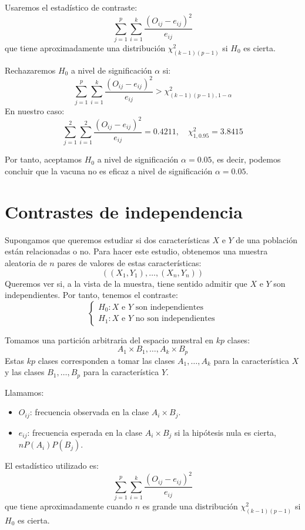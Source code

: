 \begin{exercise}
    Usaremos el estadístico de contraste:
    $$\sum_{j=1}^p \sum_{i=1}^k \frac{(O_{ij}-e_{ij})^2}{e_{ij}}$$
    que tiene aproximadamente una distribución $\chi^2_{(k-1)(p-1)}$ si $H_0$ es cierta.

    Rechazaremos $H_0$ a nivel de significación $\alpha$ si:
    $$\sum_{j=1}^p \sum_{i=1}^k \frac{(O_{ij}-e_{ij})^2}{e_{ij}} > \chi^2_{(k-1)(p-1), 1-\alpha}$$
    En nuestro caso:
    $$\sum_{j=1}^2 \sum_{i=1}^2 \frac{(O_{ij}-e_{ij})^2}{e_{ij}} = 0.4211, \quad \chi^2_{1, 0.95} = 3.8415$$

    Por tanto, aceptamos $H_0$ a nivel de significación $\alpha = 0.05$, es decir, podemos concluir que la vacuna no es eficaz a nivel de significación $\alpha = 0.05$.
\end{exercise}


\section{Contrastes de independencia}
Supongamos que queremos estudiar si dos características $X$ e $Y$ de una población están relacionadas o no.
Para hacer este estudio, obtenemos una muestra aleatoria de $n$ pares de valores de estas características:
$$((X_1, Y_1), \dots, (X_n, Y_n))$$
Queremos ver si, a la vista de la muestra, tiene sentido admitir que $X$ e $Y$ son independientes.
Por tanto, tenemos el contraste:
$$\begin{cases}
        H_0: X \text{ e } Y \text{ son independientes} \\
        H_1: X \text{ e } Y \text{ no son independientes}
    \end{cases}$$

Tomamos una partición arbitraria del espacio muestral en $kp$ clases:
$$A_1 \times B_1, \dots, A_k \times B_p$$
Estas $kp$ clases corresponden a tomar las clases $A_1, \dots, A_k$ para la característica $X$ y las clases $B_1, \dots, B_p$ para la característica $Y$.

Llamamos:
\begin{itemize}
    \item $O_{ij}$: frecuencia observada en la clase $A_i \times B_j$.
    \item $e_{ij}$: frecuencia esperada en la clase $A_i \times B_j$ si la hipótesis nula es cierta, $nP(A_i)P(B_j)$.
\end{itemize}

El estadístico utilizado es:
$$\sum_{j=1}^p \sum_{i=1}^k \frac{(O_{ij}-e_{ij})^2}{e_{ij}}$$
que tiene aproximadamente cuando $n$ es grande una distribución $\chi^2_{(k-1)(p-1)}$ si $H_0$ es cierta.


